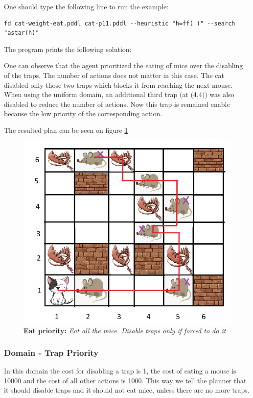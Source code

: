 One should type the following line to run the example: 

\begin{lstlisting}[numbers=none]
fd cat-weight-eat.pddl cat-p11.pddl --heuristic "h=ff( )" --search "astar(h)"
\end{lstlisting}

The program prints the following solution:



One can observe that the agent prioritized the eating of mice over the disabling of the traps. The number of actions does not matter in this case. The cat disabled only those two traps which blocks it from reaching the next mouse. When using the uniform domain, an additional third trap (at (4,4)) was also disabled to reduce the number of actions. Now this trap is remained enable because the low priority of the corresponding action.  

The resulted plan can be seen on figure \ref{fig:cat_weight_eat}

\begin{figure}[H]
    \centering
    \includegraphics[width=.6\linewidth]{fig/A3/cat_11_plan_eat.png}
    \caption{\textbf{Eat priority:} \textit{Eat all the mice. Disable traps only if forced to do it}}
    \label{fig:cat_weight_eat}
\end{figure}




\subsubsection{Domain - Trap Priority}

In this domain the cost for disabling a trap is 1, the cost of eating a mouse is 10000 and the cost of all other actions is 1000. This way we tell the planner that it should disable traps and it should not eat mice, unless there are no more traps.


